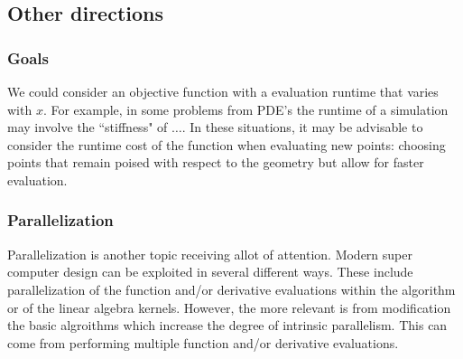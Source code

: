 \documentclass{article}
\begin{document}
\subsection{Other directions}
\subsubsection{Goals}
We could consider an objective function with a evaluation runtime that varies with $x$.
For example, in some problems from PDE's the runtime of a simulation may involve the ``stiffness" of $\ldots$.
In these situations, it may be advisable to consider the runtime cost of the function when evaluating new points: choosing points that remain poised with respect to the geometry but allow for faster evaluation.


%
%



\subsubsection{Parallelization}

Parallelization is another topic receiving allot of attention.
Modern super computer design can be exploited in several different ways.
These include parallelization of the function and/or derivative evaluations within the algorithm or of the linear algebra kernels.
However, the more relevant is from modification the basic algroithms which increase the degree of intrinsic parallelism. This can come from performing multiple function and/or derivative evaluations.
\end{document}
